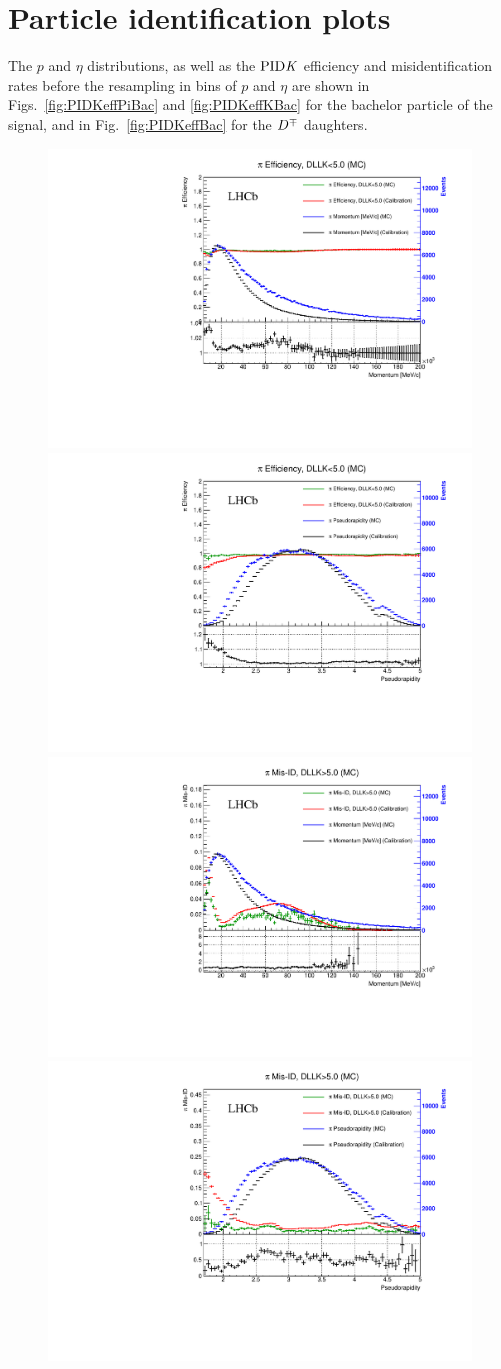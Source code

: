 \section{Particle identification plots}
\label{app:pid}

The $p$ and $\eta$
distributions, as well as the $\rm{PID}\it{K}$ efficiency and misidentification rates before the
resampling in bins of $p$ and $\eta$ are shown in Figs.~\ref{fig:PIDKeffPiBac}
and \ref{fig:PIDKeffKBac} for the bachelor particle of the signal, and in Fig.~\ref{fig:PIDKeffBac} for the $D^\mp$ daughters.
\begin{figure}[htpb]
	\begin{center}
		\includegraphics[width=0.495\linewidth]{AA-Appdx-pid/figs/Bd2DPi_BacPi_DLLKlt5_PIDeff_beforeResampling_P.pdf}
		\includegraphics[width=0.495\linewidth]{AA-Appdx-pid/figs/Bd2DPi_BacPi_DLLKlt5_PIDeff_beforeResampling_ETA.pdf} \\
		\includegraphics[width=0.495\linewidth]{AA-Appdx-pid/figs/Bd2DPi_BacPi_DLLKgt5_PIDmisID_beforeResampling_P.pdf}
		\includegraphics[width=0.495\linewidth]{AA-Appdx-pid/figs/Bd2DPi_BacPi_DLLKgt5_PIDmisID_beforeResampling_ETA.pdf} \\

\end{center}
\end{figure}
